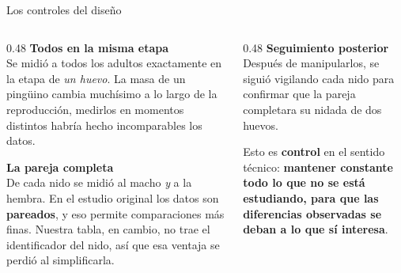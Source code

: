 \documentclass[aspectratio=169,10pt]{beamer}
\newcommand{\destaca}[1]{%
  \par\vspace{3pt}\noindent
  \colorbox{azulClaro}{%
    \parbox{\dimexpr\linewidth-2\fboxsep\relax}{\vspace{3pt}#1\vspace{3pt}}}%
  \par\vspace{3pt}}
\begin{document}
\begin{frame}{Los controles del diseño}
  \begin{columns}[T]
    \begin{column}{0.48\textwidth}
      \textbf{Todos en la misma etapa}\\[3pt]
      {\small Se midió a todos los adultos exactamente en la etapa de \emph{un huevo}.
      La masa de un pingüino cambia muchísimo a lo largo de la reproducción, medirlos
      en momentos distintos habría hecho incomparables los datos.}
      
      \vspace{0.35cm}
      \textbf{La pareja completa}\\[3pt]
      {\small De cada nido se midió al macho \emph{y} a la hembra. En el estudio original
      los datos son \textbf{pareados}, y eso permite comparaciones más finas. Nuestra
      tabla, en cambio, no trae el identificador del nido, así que esa ventaja se perdió
      al simplificarla.}
    \end{column}
    \begin{column}{0.48\textwidth}
      \textbf{Seguimiento posterior}\\[3pt]
      {\small Después de manipularlos, se siguió vigilando cada nido para confirmar
      que la pareja completara su nidada de dos huevos.}
      \vspace{0.35cm}
      \destaca{\small Esto es \textbf{control} en el sentido técnico: \textbf{mantener constante
      todo lo que no se está estudiando, para que las diferencias observadas se deban
      a lo que sí interesa}.%
 }
    \end{column}
  \end{columns}
\end{frame}
\end{document}
